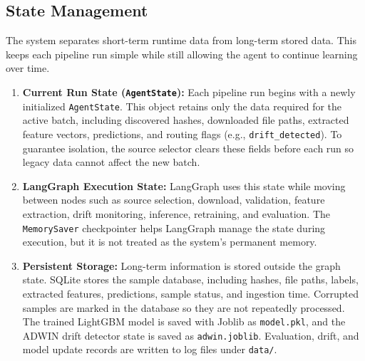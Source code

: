 \documentclass[letterpaper,10pt,conference]{ieeeconf}
\begin{document}
\subsection{State Management}

The system separates short-term runtime data from long-term stored data. This keeps each pipeline run simple while still allowing the agent to continue learning over time.

\begin{enumerate}
    \item \textbf{Current Run State (\texttt{AgentState}):}
    Each pipeline run begins with a newly initialized \texttt{AgentState}. This object retains only the data required for the active batch, including discovered hashes, downloaded file paths, extracted feature vectors, predictions, and routing flags (e.g., \texttt{drift\_detected}). To guarantee isolation, the source selector clears these fields before each run so legacy data cannot affect the new batch.

    \item \textbf{LangGraph Execution State:}
    LangGraph uses this state while moving between nodes such as source selection, download, validation, feature extraction, drift monitoring, inference, retraining, and evaluation. The \texttt{MemorySaver} checkpointer helps LangGraph manage the state during execution, but it is not treated as the system's permanent memory.

    \item \textbf{Persistent Storage:}
    Long-term information is stored outside the graph state. SQLite stores the sample database, including hashes, file paths, labels, extracted features, predictions, sample status, and ingestion time. Corrupted samples are marked in the database so they are not repeatedly processed. The trained LightGBM model is saved with Joblib as \texttt{model.pkl}, and the ADWIN drift detector state is saved as \texttt{adwin.joblib}. Evaluation, drift, and model update records are written to log files under \texttt{data/}.
\end{enumerate}
\end{document}
